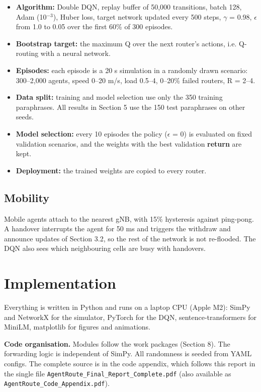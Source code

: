 \documentclass[journal]{IEEEtran}
\begin{document}
\begin{itemize}
\item \textbf{Algorithm:} Double DQN, replay buffer of 50,000 transitions, batch 128, Adam (10$^{-3}$), Huber loss, target network updated every 500 steps, $\gamma$ = 0.98, $\epsilon$ from 1.0 to 0.05 over the first 60\% of 300 episodes.
\item \textbf{Bootstrap target:} the maximum Q over the next router's actions, i.e. Q-routing \cite{ref6} with a neural network.
\item \textbf{Episodes:} each episode is a 20 s simulation in a randomly drawn scenario: 300--2,000 agents, speed 0--20 m/s, load 0.5--4, 0--20\% failed routers, R = 2--4.
\item \textbf{Data split:} training and model selection use only the 350 training paraphrases. All results in Section 5 use the 150 test paraphrases on other seeds.
\item \textbf{Model selection:} every 10 episodes the policy ($\epsilon$ = 0) is evaluated on fixed validation scenarios, and the weights with the best validation \textbf{return} are kept.
\item \textbf{Deployment:} the trained weights are copied to every router.
\end{itemize}

\subsection{Mobility}
Mobile agents attach to the nearest gNB, with 15\% hysteresis against ping-pong. A handover interrupts the agent for 50 ms and triggers the withdraw and announce updates of Section 3.2, so the rest of the network is not re-flooded. The DQN also sees which neighbouring cells are busy with handovers.

\section{Implementation}
Everything is written in Python and runs on a laptop CPU (Apple M2): SimPy and NetworkX for the simulator, PyTorch for the DQN, sentence-transformers for MiniLM, matplotlib for figures and animations.

\textbf{Code organisation.} Modules follow the work packages (Section 8). The forwarding logic is independent of SimPy. All randomness is seeded from YAML configs. The complete source is in the code appendix, which follows this report in the single file \texttt{AgentRoute\_\allowbreak Final\_\allowbreak Report\_\allowbreak Complete.pdf} (also available as \texttt{AgentRoute\_\allowbreak Code\_\allowbreak Appendix.pdf}).
\end{document}
